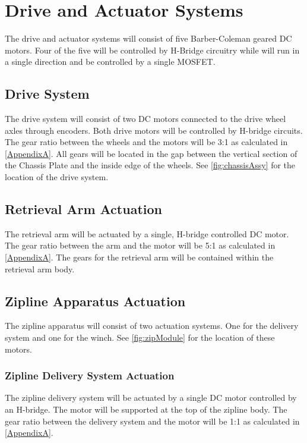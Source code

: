 \documentclass[11pt, oneside]{article} %
\begin{document}
	\newpage
	
\section{Drive and Actuator Systems}
The drive and actuator systems will consist of five Barber-Coleman geared DC motors. Four of the five will be controlled by H-Bridge circuitry while will run in a single direction and be controlled by a single MOSFET.

	\subsection{Drive System}
	The drive system will consist of two DC motors connected to the drive wheel axles through encoders. Both drive motors will be controlled by H-bridge circuits. The gear ratio between the wheels and the motors will be 3:1 as calculated in \autoref{AppendixA}. All gears will be located in the gap between the vertical section of the Chassis Plate and the inside edge of the wheels. See \autoref{fig:chassisAssy} for the location of the drive system.
	
	\subsection{Retrieval Arm Actuation}
	The retrieval arm will be actuated by a single, H-bridge controlled DC motor. The gear ratio between the arm and the motor will be 5:1 as calculated in \autoref{AppendixA}. The gears for the retrieval arm will be contained within the retrieval arm body.
	
	\subsection{Zipline Apparatus Actuation}
	The zipline apparatus will consist of two actuation systems. One for the delivery system and one for the winch. See \autoref{fig:zipModule} for the location of these motors.
		
		\subsubsection{Zipline Delivery System Actuation}
		The zipline delivery system will be actuated by a single DC motor controlled by an H-bridge. The motor will be supported at the top of the zipline body. The gear ratio between the delivery system and the motor will be 1:1 as calculated in \autoref{AppendixA}.
		
\end{document}
